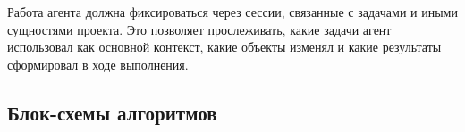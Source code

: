 Работа агента должна фиксироваться через сессии, связанные с задачами и иными сущностями проекта. Это позволяет прослеживать, какие задачи агент использовал как основной контекст, какие объекты изменял и какие результаты сформировал в ходе выполнения.

\textheadingsep
\subsection{Блок-схемы алгоритмов}